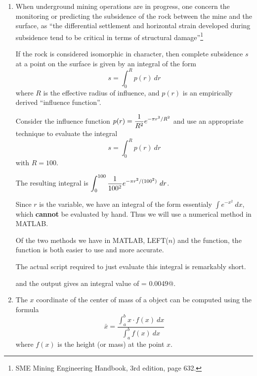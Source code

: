\begin{enumerate}[1.]
\item
\begin{Question}
  When underground mining operations are in progress, one concern the
  monitoring or predicting the subsidence of the rock between the mine
  and the surface, as ``the differential settlement and horizontal
  strain developed during subsidence tend to be critical in terms of
  structural damage''\footnote{SME Mining Engineering Handbook, 3rd
    edition, page 632.}

  If the rock is considered isomorphic in character, then complete
  subsidence $s$ at a point on the surface is given by an integral of the form
$$ s = \int_0^R  p(r)~dr$$
where $R$ is the effective radius of influence, and $p(r)$ is an
empirically derived ``influence function''.

Consider the influence function
$\displaystyle p(r) = \frac{1}{R^2} e^{-\pi r^2/R^2}$
and use an appropriate technique to evaluate the integral  
$$ s = \int_0^R  p(r)~dr$$ with $R = 100$.

\end{Question}

\begin{Solution}
The resulting integral is 
    $\displaystyle \int_0^{100} \frac{1}{100^2} e^{-\pi r^2/(100^2)}~dr$.  

    Since $r$ is the variable, we have an integral of the form
    essentialy $\int e^{-x^2}~dx$, which {\bf cannot} be evaluated by
    hand.  Thus we will use a numerical method in MATLAB.  

    Of the two methods we have in MATLAB, LEFT($n$) and the
    \verb@integral@ function, the \verb@integral@ function is both
    easier to use and more accurate.

    The actual script required to just evaluate this integral is
    remarkably short.



and the output gives an integral value of \verb@I = 0.0049@.
\end{Solution}


\item
\begin{Question}
  The $x$ coordinate of the center of mass of a object can be computed using the formula
$$\bar{x} = \frac{\int_a^b x \cdot f(x)~dx}{\int_a^b f(x)~dx}$$
where $f(x)$ is the height (or mass) at the point $x$.


\end{Question}
\end{enumerate}
